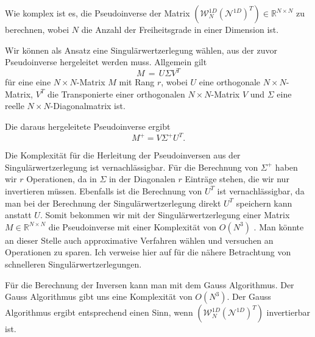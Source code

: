 Wie komplex ist es, die Pseudoinverse der Matrix $(\mathcal{W}_N^{1D} (\mathcal{N}^{1D})^T) \in \mathbb{R}^{N \times N}$ zu berechnen, wobei $N$ die Anzahl der Freiheitsgrade in einer Dimension ist.

Wir können als Ansatz eine Singulärwertzerlegung wählen, aus der zuvor Pseudoinverse hergeleitet werden muss.
Allgemein gilt
\begin{equation*}
M\,=\,U\Sigma V^{T}
\end{equation*}
für eine eine $N \times N$-Matrix $M$ mit Rang $r$, wobei
$U$ eine orthogonale $N\times N$-Matrix, $V^{T}$ die Transponierte einer orthogonalen $N \times N$-Matrix $V$ und
$\Sigma$  eine reelle  $N\times N$-Diagonalmatrix ist.

Die daraus hergeleitete Pseudoinverse ergibt
\begin{equation*}
M^{+}=V\Sigma ^{+}U^{T}.
\end{equation*}

Die Komplexität für die Herleitung der Pseudoinversen aus der Singulärwertzerlegung ist vernachlässigbar. Für die Berechnung von $\Sigma^+$ haben wir $r$ Operationen, da in $\Sigma$ in der Diagonalen $r$ Einträge stehen, die wir nur invertieren müssen. Ebenfalls ist die Berechnung von $U^{T}$ ist vernachlässigbar, da man bei der Berechnung der Singulärwertzerlegung direkt $U^{T}$ speichern kann anstatt $U$.
Somit bekommen wir mit der Singulärwertzerlegung einer Matrix $M \in \mathbb{R}^{N \times N}$ die Pseudoinverse mit einer Komplexität von $O(N^3)$ \cite[2]{SVD}. Man könnte an dieser Stelle auch approximative Verfahren wählen und versuchen an Operationen zu sparen. Ich verweise hier auf \cite{SVD} für die nähere Betrachtung von schnelleren Singulärwertzerlegungen.

Für die Berechnung der Inversen kann man mit dem Gauss Algorithmus. Der Gauss Algorithmus gibt uns eine Komplexität von $O(N^3)$. 
Der Gauss Algorithmus ergibt entsprechend einen Sinn, wenn $(\mathcal{W}_N^{1D} (\mathcal{N}^{1D})^T)$ invertierbar ist.

